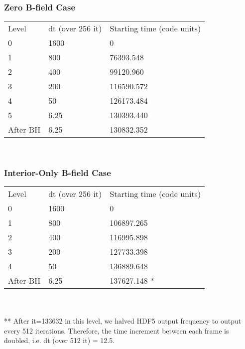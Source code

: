 \documentclass{article}
\begin{document}
\subsubsection{Zero B-field Case}
\begin{tabular}{l l l}
Level		& dt (over 256 it)	& Starting time (code units) \\
0		& 1600			& 0 		\\
1		& 800			& 76393.548	\\ %
2		& 400			& 99120.960	\\ %
3		& 200			& 116590.572	\\ %
4		& 50			& 126173.484	\\ %
5		& 6.25			& 130393.440	\\ %
After BH 	& 6.25			& 130832.352	\\ %
\end{tabular}
\\
\subsubsection{Interior-Only B-field Case}
\begin{tabular}{l l l}
Level		& dt (over 256 it)	& Starting time (code units) \\
0		& 1600			& 0		\\
1		& 800			& 106897.265	\\
2		& 400			& 116995.898	\\
3 		& 200			& 127733.398	\\
4		& 50			& 136889.648 	\\
After BH	& 6.25			& 137627.148 *	\\
\end{tabular}
\\
\\
** After it=133632 in this level, we halved HDF5 output frequency to output every 512 iterations. Therefore, the time increment between each frame is doubled, i.e. dt (over 512 it) = 12.5. 
\\
\end{document}
